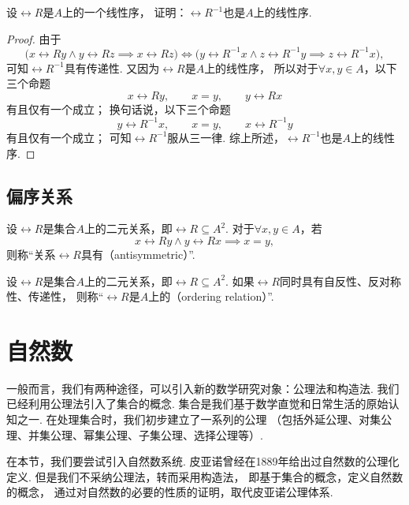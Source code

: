\begin{example}
设\(\rel{R}\)是\(A\)上的一个线性序，
证明：\(\rel{R}^{-1}\)也是\(A\)上的线性序.
\begin{proof}
由于\[
	\bigl( x \rel{R} y \land y \rel{R} z \implies x \rel{R} z \bigr)
	\iff
	\bigl( y \rel{R}^{-1} x \land z \rel{R}^{-1} y \implies z \rel{R}^{-1} x \bigr),
\]
可知\(\rel{R}^{-1}\)具有传递性.
又因为\(\rel{R}\)是\(A\)上的线性序，
所以对于\(\forall x,y \in A\)，以下三个命题\[
	x \rel{R} y, \qquad
	x = y, \qquad
	y \rel{R} x
\]有且仅有一个成立；
换句话说，以下三个命题\[
	y \rel{R}^{-1} x, \qquad
	x = y, \qquad
	x \rel{R}^{-1} y
\]有且仅有一个成立；
可知\(\rel{R}^{-1}\)服从三一律.
综上所述，\(\rel{R}^{-1}\)也是\(A\)上的线性序.
\end{proof}
\end{example}

\subsection{偏序关系}
\begin{definition}
设\(\rel{R}\)是集合\(A\)上的二元关系，即\(\rel{R} \subseteq A^2\).
对于\(\forall x,y \in A\)，若\[
	x\rel{R}y \land y\rel{R}x \implies x = y,
\]
则称“关系\(\rel{R}\)具有（antisymmetric）”.
\end{definition}

\begin{definition}
设\(\rel{R}\)是集合\(A\)上的二元关系，即\(\rel{R} \subseteq A^2\).
如果\(\rel{R}\)同时具有自反性、反对称性、传递性，
则称“\(\rel{R}\)是\(A\)上的（ordering relation）”.
\end{definition}

\section{自然数}
一般而言，我们有两种途径，可以引入新的数学研究对象：公理法和构造法.
我们已经利用公理法引入了集合的概念.
集合是我们基于数学直觉和日常生活的原始认知之一.
在处理集合时，我们初步建立了一系列的公理%
（包括外延公理、对集公理、并集公理、幂集公理、子集公理、选择公理等）.

在本节，我们要尝试引入自然数系统.
皮亚诺曾经在1889年给出过自然数的公理化定义.
但是我们不采纳公理法，转而采用构造法，
即基于集合的概念，定义自然数的概念，
通过对自然数的必要的性质的证明，取代皮亚诺公理体系.

